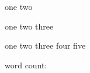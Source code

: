 \documentclass[00-main.tex]{subfiles}
\begin{document}
\begin{counted}
one two
\end{counted}

\begin{listing}[!ht]
  \begin{RustListing}
    one two three
  \end{RustListing}
  \caption{one two three four five}
  \label{one two}
\end{listing}

word count: \thewords
\end{document}

